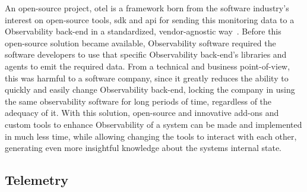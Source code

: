 An open-source project, \gls{otel} is a framework born from the software industry's interest on open-source tools, \gls{sdk} and \gls{api} for sending this monitoring data to a Observability back-end in a standardized, vendor-agnostic way~\Parencite{observability_primer_2022}. Before this open-source solution became available, Observability software required the software developers to use that specific Observability back-end's libraries and agents to emit the required data. From a technical and business point-of-view, this was harmful to a software company, since it greatly reduces the ability to quickly and easily change Observability back-end, locking the company in using the same observability software for long periods of time, regardless of the adequacy of it.
With this solution, open-source and innovative add-ons and custom tools to enhance Observability of a system can be made and implemented in much less time, while allowing changing the tools to interact with each other, generating even more insightful knowledge about the systems internal state.

\subsection{Telemetry}\label{state-of-the-art:ss:telemetry}

